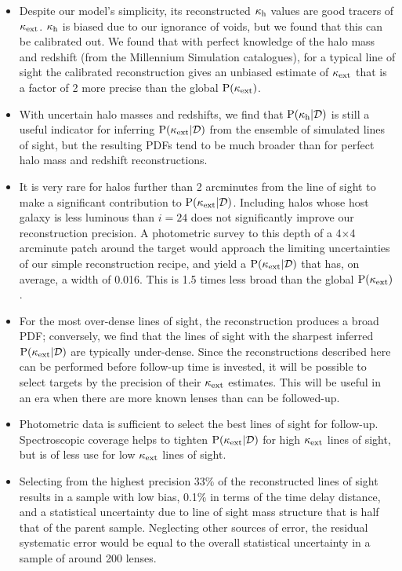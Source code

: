 \documentclass[useAMS,usenatbib]{mn2e}
\begin{document}
\begin{itemize} 

\item Despite our model's simplicity, its reconstructed $\kappa_{\rm h}$ values are
good tracers of $\kappa_{\rm ext}$. $\kappa_{\rm h}$ is biased due to our ignorance of voids, but we found that this can be calibrated out. We found that with perfect knowledge of
the halo mass and redshift (from the Millennium Simulation catalogues), for a
typical line of sight the calibrated reconstruction gives an unbiased estimate
of $\kappa_{\rm ext}$ that is a factor of 2 more precise than the global ${\rm P}(\kappa_{\rm ext})$.

\item With uncertain halo masses and redshifts, we find that
${\rm P}(\kappa_{\rm h}|{\mathcal{D}})$ is still a useful indicator for inferring
${\rm P}(\kappa_{\rm ext}|{\mathcal{D}})$ from the ensemble of simulated lines of sight, but the
resulting PDFs tend to be much broader than for perfect halo mass and redshift
reconstructions.

\item It is very rare for halos further than 2 arcminutes from the line of
sight to make a significant contribution to ${\rm P}(\kappa_{\rm ext}|{\mathcal{D}})$. Including
halos whose host galaxy is less luminous than $i=24$ does not significantly
improve our reconstruction precision.  A photometric survey to this depth of a
4$\times$4 arcminute patch around the target would approach the limiting
uncertainties of our simple reconstruction recipe, and yield a 
${\rm P}(\kappa_{\rm ext}|{\mathcal{D}})$ that has, on average, a width of 0.016. This is 1.5 times
less broad than the global ${\rm P}(\kappa_{\rm ext})$.

\item  For the most over-dense lines of sight, the reconstruction produces a
broad PDF; conversely, we find that the lines of sight with the sharpest
inferred ${\rm P}(\kappa_{\rm ext}|{\mathcal{D}})$ are typically under-dense. Since the
reconstructions described here can be performed before follow-up time is
invested, it will be possible to select targets by the precision of their
$\kappa_{\rm ext}$ estimates. This will be useful
in an era when there are more known lenses than can be followed-up.

\item Photometric data is sufficient  to select the best lines of sight for
follow-up. Spectroscopic coverage helps to tighten  ${\rm P}(\kappa_{\rm ext}|{\mathcal{D}})$ for
high $\kappa_{\rm ext}$ lines of sight, but is of less use for low $\kappa_{\rm ext}$ lines of
sight.

\item Selecting from the highest precision 33\% of the reconstructed lines of sight
results in a sample with low bias, 0.1\% in terms of the time delay distance,
and a statistical uncertainty due to line of sight mass structure that is half
that of the parent sample. Neglecting other sources of error, the residual systematic error would be equal to the
overall statistical uncertainty in a sample of around 200 lenses.


\end{itemize}
\end{document}
